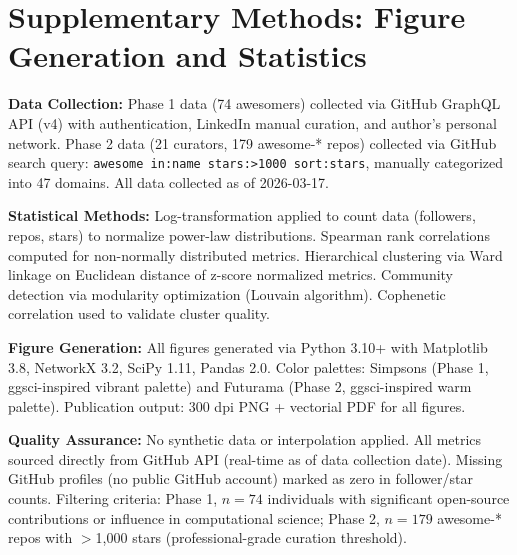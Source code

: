 
\section*{Supplementary Methods: Figure Generation and Statistics}

\textbf{Data Collection:}
Phase 1 data (74 awesomers) collected via GitHub GraphQL API (v4) with authentication, LinkedIn manual curation, and author's personal network.
Phase 2 data (21 curators, 179 awesome-* repos) collected via GitHub search query: \texttt{awesome in:name stars:>1000 sort:stars}, manually categorized into 47 domains.
All data collected as of 2026-03-17.

\textbf{Statistical Methods:}
Log-transformation applied to count data (followers, repos, stars) to normalize power-law distributions.
Spearman rank correlations computed for non-normally distributed metrics.
Hierarchical clustering via Ward linkage on Euclidean distance of z-score normalized metrics.
Community detection via modularity optimization (Louvain algorithm).
Cophenetic correlation used to validate cluster quality.

\textbf{Figure Generation:}
All figures generated via Python 3.10+ with Matplotlib 3.8, NetworkX 3.2, SciPy 1.11, Pandas 2.0.
Color palettes: Simpsons (Phase 1, ggsci-inspired vibrant palette) and Futurama (Phase 2, ggsci-inspired warm palette).
Publication output: 300 dpi PNG + vectorial PDF for all figures.

\textbf{Quality Assurance:}
No synthetic data or interpolation applied.
All metrics sourced directly from GitHub API (real-time as of data collection date).
Missing GitHub profiles (no public GitHub account) marked as zero in follower/star counts.
Filtering criteria: Phase 1, $n=74$ individuals with significant open-source contributions or influence in computational science; Phase 2, $n=179$ awesome-* repos with $>$1,000 stars (professional-grade curation threshold).
